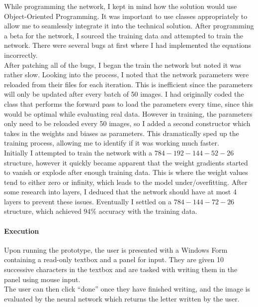 \documentclass{article}
\begin{document}
While programming the network, I kept in mind how the solution would use Object-Oriented Programming. It was important to use classes appropriately to allow me to seamlessly integrate it into the technical solution. After programming a beta for the network, I sourced the training data and attempted to train the network. There were several bugs at first where I had implemented the equations incorrectly. \\

After patching all of the bugs, I began the train the network but noted it was rather slow. Looking into the process, I noted that the network parameters were reloaded from their files for each iteration. This is inefficient since the parameters will only be updated after every batch of 50 images. I had originally coded the class that performs the forward pass to load the parameters every time, since this would be optimal while evaluating real data. However in training, the parameters only need to be reloaded every 50 images, so I added a second constructor which takes in the weights and biases as parameters. This dramatically sped up the training process, allowing me to identify if it was working much faster. \\ 

Initially I attempted to train the network with a \(784-192-144-52-26\) structure, however it quickly became apparent that the weight gradients started to vanish or explode after enough training data. This is where the weight values tend to either zero or infinity, which leads to the model under/overfitting. After some research into layers, I deduced that the network should have at most 4 layers to prevent these issues. Eventually I settled on a \(784-144-72-26\) structure, which achieved 94\% accuracy with the training data.

\paragraph{Execution\\}
Upon running the prototype, the user is presented with a Windows Form containing a read-only textbox and a panel for input. They are given 10 successive characters in the textbox and are tasked with writing them in the panel using mouse input. \\

The user can then click “done” once they have finished writing, and the image is evaluated by the neural network which returns the letter written by the user.
\end{document}
